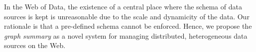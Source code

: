 In the Web of Data, the existence of a central place where the schema of data sources is kept is unreasonable due to the scale and dynamicity of the data. Our rationale is that a pre-defined schema cannot be enforced. Hence, we propose the \emph{graph summary} as a novel system for managing distributed, heterogeneous data sources on the Web.

%
%
%
%
%
